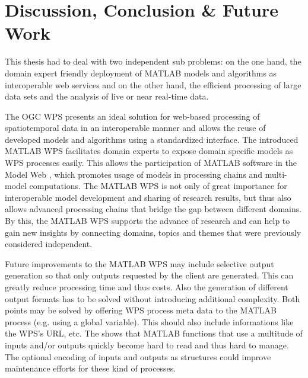 
\chapter{Discussion, Conclusion \& Future Work}
\label{sec:conclusion}

This thesis had to deal with two independent sub problems: on the one hand, the domain expert friendly deployment of MATLAB models and algorithms as interoperable web services and on the other hand, the efficient processing of large data sets and the analysis of live or near real-time data.

The \ac{OGC} \acl{WPS} presents an ideal solution for web-based processing of spatiotemporal data in an interoperable manner and allows the reuse of developed models and algorithms using a standardized interface. The introduced MATLAB WPS facilitates domain experts to expose domain specific models as WPS processes easily. This allows the participation of MATLAB software in the Model Web \citep{geller2008looking}, which promotes usage of models in processing chains and multi-model computations. The MATLAB WPS is not only of great importance for interoperable model development and sharing of research results, but thus also allows advanced processing chains that bridge the gap between different domains. By this, the MATLAB WPS supports the advance of research and can help to gain new insights by connecting domains, topics and themes that were previously considered independent.

Future improvements to the MATLAB WPS may include selective output generation so that only outputs requested by the client are generated. This can greatly reduce processing time and thus costs. Also the generation of different output formats has to be solved without introducing additional complexity. Both points may be solved by offering WPS process meta data to the MATLAB process (e.g. using a global variable). This should also include informations like the WPS's URL, etc. The \la shows that MATLAB functions that use a multitude of inputs and/or outputs quickly become hard to read and thus hard to manage. The optional encoding of inputs and outputs as structures could improve maintenance efforts for these kind of processes.


